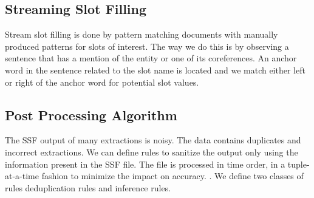\subsection{Streaming Slot Filling}

Stream slot filling is done by pattern matching documents with manually produced patterns for slots of interest. The way we do this is by observing a sentence that has a mention of the entity or one of its coreferences. An anchor word in the sentence related to the slot name is located and we match either left or right of the anchor word for potential slot values. 

\subsection{Post Processing Algorithm}

The SSF output of many extractions is noisy. The data contains duplicates and incorrect extractions. We can define rules to sanitize the output only using the information present in the SSF file. The file is processed in time order, in a tuple-at-a-time fashion to minimize the impact on accuracy. . We define two classes of rules deduplication rules and inference rules.
